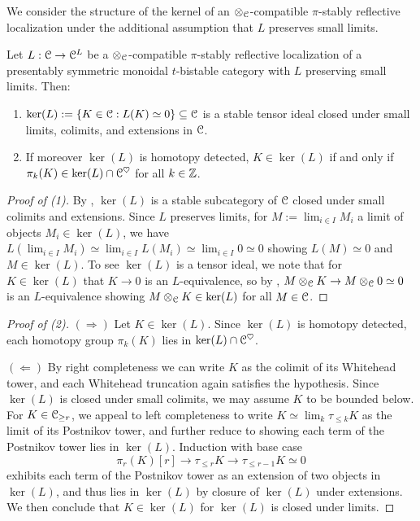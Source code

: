We consider the structure of the kernel of an $\otimes_{\EuScript{C}}$-compatible $\pi$-stably reflective localization under the additional assumption that $L$ preserves small limits. 
\begin{lemma}\label{lem: kernel structure L limit preserving}
    Let $L:\EuScript{C}\to\EuScript{C}^{L}$ be a $\otimes_{\EuScript{C}}$-compatible $\pi$-stably reflective localization of a presentably symmetric monoidal $t$-bistable category with $L$ preserving small limits. Then: 
    \begin{enumerate}
        \item $\ker(L):=\{K\in\EuScript{C}:L(K)\simeq0\}\subseteq\EuScript{C}$ is a stable tensor ideal closed under small limits, colimits, and extensions in $\EuScript{C}$. 
        \item If moreover $\ker(L)$ is homotopy detected, $K\in\ker(L)$ if and only if $\pi_{k}(K)\in\ker(L)\cap\EuScript{C}^{\heartsuit}$ for all $k\in\mathbb{Z}$. 
    \end{enumerate}
\end{lemma}
\begin{proof}[Proof of (1)]
    By \cite[Def. 2.26 \& Lem. 2.27]{LocalizingTStruct}, $\ker(L)$ is a stable subcategory of $\EuScript{C}$ closed under small colimits and extensions. Since $L$ preserves limits, for $M:=\lim_{i\in I}M_{i}$ a limit of objects $M_{i}\in\ker(L)$, we have $L(\lim_{i\in I}M_{i})\simeq \lim_{i\in I}L(M_{i})\simeq\lim_{i\in I}0\simeq0$ showing $L(M)\simeq0$ and $M\in\ker(L)$. To see $\ker(L)$ is a tensor ideal, we note that for $K\in\ker(L)$ that $K\to 0$ is an $L$-equivalence, so by , $M\otimes_{\EuScript{C}}K\to M\otimes_{\EuScript{C}}0\simeq 0$ is an $L$-equivalence showing $M\otimes_{\EuScript{C}}K\in\ker(L)$ for all $M\in\EuScript{C}$. 
\end{proof}
\begin{proof}[Proof of (2)]
    $(\Rightarrow)$ Let $K\in\ker(L)$. Since $\ker(L)$ is homotopy detected, each homotopy group $\pi_{k}(K)$ lies in $\ker(L)\cap\EuScript{C}^{\heartsuit}$. 

    $(\Leftarrow)$ By right completeness we can write $K$ as the colimit of its Whitehead tower, and each Whitehead truncation again satisfies the hypothesis. Since $\ker(L)$ is closed under small colimits, we may assume $K$ to be bounded below. For $K\in\EuScript{C}_{\geq r}$, we appeal to left completeness to write $K\simeq\lim_{k}\tau_{\leq k}K$ as the limit of its Postnikov tower, and further reduce to showing each term of the Postnikov tower lies in $\ker(L)$. Induction with base case 
    $$\pi_{r}(K)[r]\to\tau_{\leq r}K\to\tau_{\leq r-1}K\simeq0$$
    exhibits each term of the Postnikov tower as an extension of two objects in $\ker(L)$, and thus lies in $\ker(L)$ by closure of $\ker(L)$ under extensions. We then conclude that $K\in\ker(L)$ for $\ker(L)$ is closed under limits. 
\end{proof}
